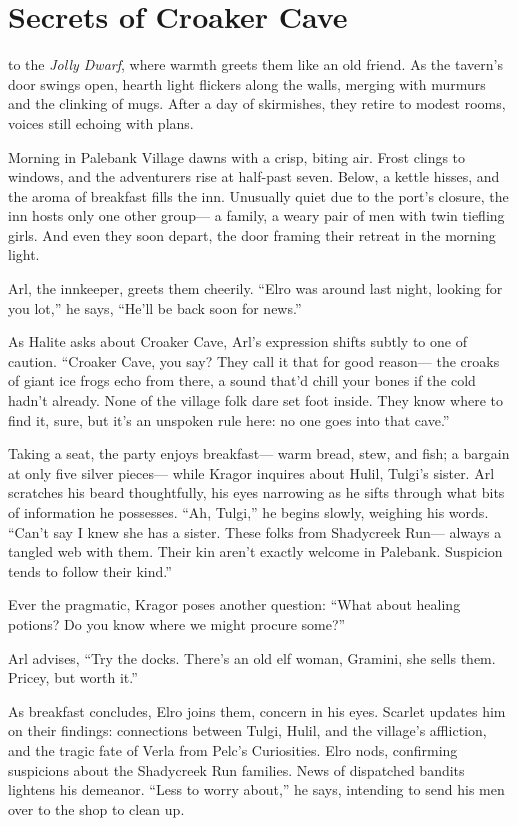 \documentclass[
  letterpaper,12pt,twoside,twocolumn,openany,
  nodeprecatedcode,bg=full]{dndbook}
\begin{document}
\chapter{Secrets of Croaker Cave}\label{secrets-of-croaker-cave}

 to the \emph{Jolly
Dwarf}, where warmth greets them like an old friend. As the tavern's
door swings open, hearth light flickers along the walls, merging with
murmurs and the clinking of mugs. After a day of skirmishes, they retire
to modest rooms, voices still echoing with plans.

Morning in Palebank Village dawns with a crisp, biting air. Frost clings
to windows, and the adventurers rise at half-past seven. Below, a kettle
hisses, and the aroma of breakfast fills the inn. Unusually quiet due to
the port's closure, the inn hosts only one other group--- a family, a
weary pair of men with twin tiefling girls. And even they soon depart,
the door framing their retreat in the morning light.

Arl, the innkeeper, greets them cheerily. ``Elro was around last night,
looking for you lot,'' he says, ``He'll be back soon for news.''

As Halite asks about Croaker Cave, Arl's expression shifts subtly to one
of caution. ``Croaker Cave, you say? They call it that for good
reason--- the croaks of giant ice frogs echo from there, a sound that'd
chill your bones if the cold hadn't already. None of the village folk
dare set foot inside. They know where to find it, sure, but it's an
unspoken rule here: no one goes into that cave.''

Taking a seat, the party enjoys breakfast--- warm bread, stew, and fish;
a bargain at only five silver pieces--- while Kragor inquires about
Hulil, Tulgi's sister. Arl scratches his beard thoughtfully, his eyes
narrowing as he sifts through what bits of information he possesses.
``Ah, Tulgi,'' he begins slowly, weighing his words. ``Can't say I knew
she has a sister. These folks from Shadycreek Run--- always a tangled
web with them. Their kin aren't exactly welcome in Palebank. Suspicion
tends to follow their kind.''

Ever the pragmatic, Kragor poses another question: ``What about healing
potions? Do you know where we might procure some?''

Arl advises, ``Try the docks. There's an old elf woman, Gramini, she
sells them. Pricey, but worth it.''

As breakfast concludes, Elro joins them, concern in his eyes. Scarlet
updates him on their findings: connections between Tulgi, Hulil, and the
village's affliction, and the tragic fate of Verla from Pelc's
Curiosities. Elro nods, confirming suspicions about the Shadycreek Run
families. News of dispatched bandits lightens his demeanor. ``Less to
worry about,'' he says, intending to send his men over to the shop to
clean up.
\end{document}
